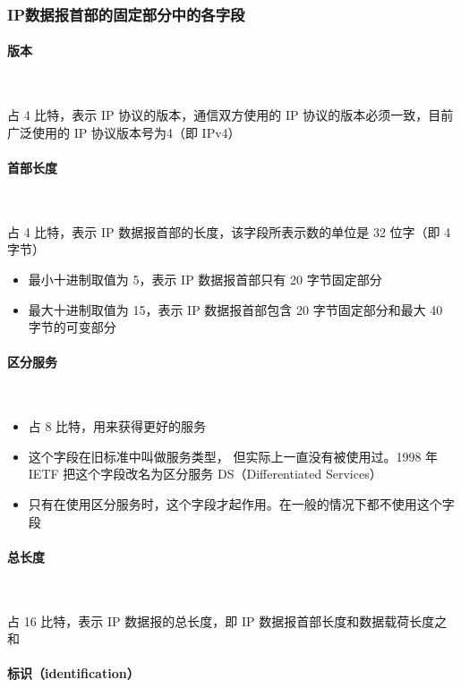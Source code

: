 \documentclass[cs4size,a4paper,10pt]{ctexart}
\begin{document}
	\subsubsection{IP数据报首部的固定部分中的各字段}

	\paragraph{版本}~{}

	占 4 比特，表示 IP 协议的版本，通信双方使用的 IP 协议的版本必须一致，目前广泛使用的 IP 协议版本号为4（即 IPv4）

	\paragraph{首部长度}~{}

	占 4 比特，表示 IP 数据报首部的长度，该字段所表示数的单位是 32 位字（即 4 字节）
	\begin{itemize}
		\item 最小十进制取值为 5，表示 IP 数据报首部只有 20 字节固定部分
		\item 最大十进制取值为 15，表示 IP 数据报首部包含 20 字节固定部分和最大 40 字节的可变部分
	\end{itemize}

	\paragraph{区分服务}~{}

	\begin{itemize}
		\item 占 8 比特，用来获得更好的服务
		\item 这个字段在旧标准中叫做服务类型， 但实际上一直没有被使用过。1998 年 IETF 把这个字段改名为区分服务 DS（Differentiated Services）
		\item 只有在使用区分服务时，这个字段才起作用。在一般的情况下都不使用这个字段
	\end{itemize}

	\paragraph{总长度}~{}

	占 16 比特，表示 IP 数据报的总长度，即 IP 数据报首部长度和数据载荷长度之和

	\paragraph{标识（identification）}~{}
\end{document}
